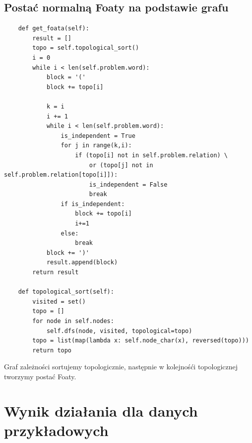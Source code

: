 \documentclass{article}
\begin{document}
        \subsection{Postać normalną Foaty na podstawie grafu}
            \begin{lstlisting}
    def get_foata(self):
        result = []
        topo = self.topological_sort()
        i = 0
        while i < len(self.problem.word):
            block = '('
            block += topo[i]

            k = i
            i += 1
            while i < len(self.problem.word):
                is_independent = True
                for j in range(k,i):
                    if (topo[i] not in self.problem.relation) \
                        or (topo[j] not in self.problem.relation[topo[i]]):
                        is_independent = False
                        break
                if is_independent:
                    block += topo[i]
                    i+=1
                else:
                    break
            block += ')'
            result.append(block)
        return result

    def topological_sort(self):
        visited = set()
        topo = []
        for node in self.nodes:
            self.dfs(node, visited, topological=topo)
        topo = list(map(lambda x: self.node_char(x), reversed(topo)))
        return topo
            \end{lstlisting}
            Graf zależności sortujemy topologicznie, następnie w kolejnośći topologicznej tworzymy postać Foaty. 
    
    \newpage
    \section{Wynik działania dla danych przykładowych}
\end{document}
